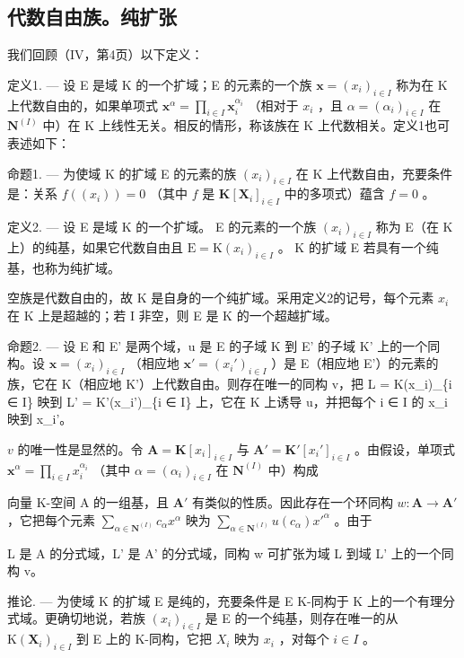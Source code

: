 \subsection{代数自由族。纯扩张}

我们回顾（IV，第4页）以下定义：

定义1. --- 设 E 是域 K 的一个扩域；E 的元素的一个族 \(\mathbf{x} = (x_i)_{i \in I}\) 称为在 K 上代数自由的，如果单项式 \(\mathbf{x}^\alpha = \prod_{i \in I} \mathbf{x}_i^{\alpha_i}\) （相对于 \(x_i\) ，且 \(\alpha = (\alpha_i)_{i \in I}\) 在 \(\mathbf{N}^{(I)}\) 中）在 K 上线性无关。相反的情形，称该族在 K 上代数相关。定义1也可表述如下：

命题1. --- 为使域 K 的扩域 E 的元素的族 \((x_{i})_{i\in I}\) 在 K 上代数自由，充要条件是：关系 \(f((x_i)) = 0\) （其中 \(f\) 是 \(\mathbf{K}[\mathbf{X}_i]_{i\in I}\) 中的多项式）蕴含 \(f = 0\) 。

定义2. --- 设 E 是域 K 的一个扩域。 E 的元素的一个族 \((x_{i})_{i\in I}\) 称为 E（在 K 上）的纯基，如果它代数自由且 \(\mathrm{E}=\mathrm{K}(x_{i})_{i\in I}\) 。 K 的扩域 E 若具有一个纯基，也称为纯扩域。

空族是代数自由的，故 K 是自身的一个纯扩域。采用定义2的记号，每个元素 \(x_{i}\) 在 K 上是超越的；若 I 非空，则 E 是 K 的一个超越扩域。

命题2. --- 设 E 和 E' 是两个域，u 是 E 的子域 K 到 E' 的子域 K' 上的一个同构。设 \(\mathbf{x} = (x_i)_{i \in I}\) （相应地 \(\mathbf{x}' = (x_i')_{i \in I}\) ）是 E（相应地 E'）的元素的族，它在 K（相应地 K'）上代数自由。则存在唯一的同构 v，把 L = K(x\_i)\_\{i ∈ I\} 映到 L' = K'(x\_i')\_\{i ∈ I\} 上，它在 K 上诱导 u，并把每个 i ∈ I 的 x\_i 映到 x\_i'。

\(v\) 的唯一性是显然的。令 \(\mathbf{A} = \mathbf{K}[x_i]_{i \in I}\) 与 \(\mathbf{A}' = \mathbf{K}'[x_i']_{i \in I}\) 。由假设，单项式 \(\mathbf{x}^\alpha = \prod_{i \in I} x_i^{\alpha_i}\) （其中 \(\alpha = (\alpha_i)_{i \in I}\) 在 \(\mathbf{N}^{(I)}\) 中）构成

向量 K-空间 A 的一组基，且 \(\mathbf{A}'\) 有类似的性质。因此存在一个环同构 \(w: \mathbf{A} \to \mathbf{A}'\) ，它把每个元素 \(\sum_{\alpha \in \mathbf{N}^{(I)}} c_{\alpha} x^{\alpha}\) 映为 \(\sum_{\alpha \in \mathbf{N}^{(I)}} u(c_{\alpha}) x'^{\alpha}\) 。由于

L 是 A 的分式域，L' 是 A' 的分式域，同构 w 可扩张为域 L 到域 L' 上的一个同构 v。

推论. --- 为使域 K 的扩域 E 是纯的，充要条件是 E K-同构于 K 上的一个有理分式域。更确切地说，若族 \((x_{i})_{i\in I}\) 是 E 的一个纯基，则存在唯一的从 \(\mathrm{K}(\mathbf{X}_{i})_{i\in I}\) 到 E 上的 K-同构，它把 \(X_{i}\) 映为 \(x_{i}\) ，对每个 \(i\in I\) 。

